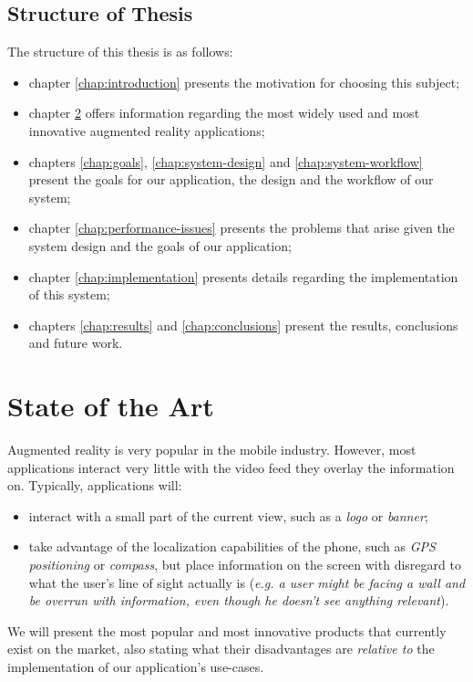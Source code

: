 \documentclass[a4paper,onecolumn,oneside,titlepage,11pt]{report}
\begin{document}
\section{Structure of Thesis}
The structure of this thesis is as follows:
\begin{itemize}
	\item chapter \ref{chap:introduction} presents the motivation for choosing this subject;
	\item chapter \ref{chap:state-of-the-art} offers information regarding the most widely used and most innovative augmented reality applications;
	\item chapters \ref{chap:goals}, \ref{chap:system-design} and \ref{chap:system-workflow} present the goals for our application, the design and the workflow of our system;
	\item chapter \ref{chap:performance-issues} presents the problems that arise given the system design and the goals of our application;
	\item chapter \ref{chap:implementation} presents details regarding the  implementation of this system;
	\item chapters \ref{chap:results} and \ref{chap:conclusions} present the results, conclusions and future work.
\end{itemize}

\chapter{State of the Art}
\label{chap:state-of-the-art}
Augmented reality is very popular in the mobile industry. However, most applications interact very little with the video feed they overlay the information on. Typically, applications will:
\begin{itemize}
	\item interact with a small part of the current view, such as a \emph{logo} or \emph{banner};
	\item take advantage of the localization capabilities of the phone, such as \emph{GPS positioning} or \emph{compass}, but place information on the screen with disregard to what the user's line of sight actually is (\emph{e.g. a user might be facing a wall and be overrun with information, even though he doesn't see anything relevant}).
\end{itemize}
We will present the most popular and most innovative products that currently exist on the market, also stating what their disadvantages are \emph{relative to} the implementation of our application's use-cases.
\end{document}
